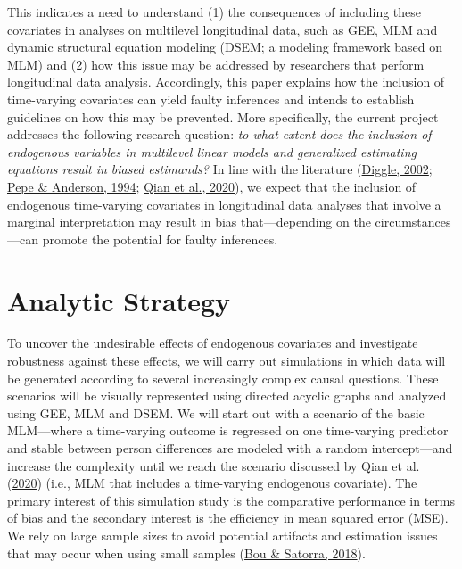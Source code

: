 \documentclass[
  12pt,
  a4paper,
]{article}
\begin{document}
This indicates a need to understand (1) the consequences of including
these covariates in analyses on multilevel longitudinal data, such as
GEE, MLM and dynamic structural equation modeling (DSEM; a modeling
framework based on MLM) and (2) how this issue may be addressed by
researchers that perform longitudinal data analysis. Accordingly, this
paper explains how the inclusion of time-varying covariates can yield
faulty inferences and intends to establish guidelines on how this may be
prevented. More specifically, the current project addresses the
following research question: \emph{to what extent does the inclusion of
endogenous variables in multilevel linear models and generalized
estimating equations result in biased estimands?} In line with the
literature (\protect\hyperlink{ref-diggle2002}{Diggle, 2002};
\protect\hyperlink{ref-pepe1994}{Pepe \& Anderson, 1994};
\protect\hyperlink{ref-qian2020}{Qian et al., 2020}), we expect that the
inclusion of endogenous time-varying covariates in longitudinal data
analyses that involve a marginal interpretation may result in bias
that---depending on the circumstances---can promote the potential for
faulty inferences.

\hypertarget{analytic-strategy}{%
\section{Analytic Strategy}\label{analytic-strategy}}

To uncover the undesirable effects of endogenous covariates and
investigate robustness against these effects, we will carry out
simulations in which data will be generated according to several
increasingly complex causal questions. These scenarios will be visually
represented using directed acyclic graphs and analyzed using GEE, MLM
and DSEM. We will start out with a scenario of the basic MLM---where a
time-varying outcome is regressed on one time-varying predictor and
stable between person differences are modeled with a random
intercept---and increase the complexity until we reach the scenario
discussed by Qian et al. (\protect\hyperlink{ref-qian2020}{2020}) (i.e.,
MLM that includes a time-varying endogenous covariate). The primary
interest of this simulation study is the comparative performance in
terms of bias and the secondary interest is the efficiency in mean
squared error (MSE). We rely on large sample sizes to avoid potential
artifacts and estimation issues that may occur when using small samples
(\protect\hyperlink{ref-bou2018}{Bou \& Satorra, 2018}).
\end{document}
